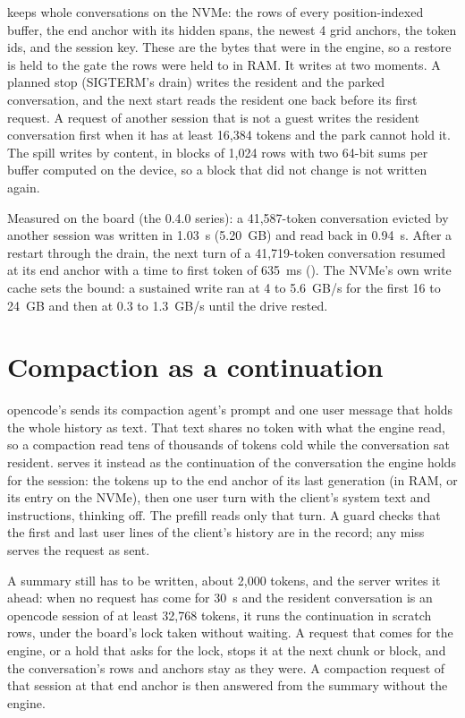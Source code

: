  keeps whole conversations on the NVMe: the rows of every position-indexed buffer, the end anchor with its hidden spans, the newest 4 grid anchors, the token ids,  and the session key. These are the bytes that were in the engine, so a restore is held to the gate the rows were held to in RAM. It writes at two moments. A planned stop (SIGTERM's drain) writes the resident and the parked conversation, and the next start reads the resident one back before its first request. A request of another session that is not a guest writes the resident conversation first when it has at least 16,384 tokens and the park cannot hold it. The spill writes by content, in blocks of 1,024 rows with two 64-bit sums per buffer computed on the device, so a block that did not change is not written again.

Measured on the board (the 0.4.0 series): a 41,587-token conversation evicted by another session was written in 1.03~s (5.20~GB) and read back in 0.94~s. After a restart through the drain, the next turn of a 41,719-token conversation resumed at its end anchor with a time to first token of 635~ms (\measured). The NVMe's own write cache sets the bound: a sustained write ran at 4 to 5.6~GB/s for the first 16 to 24~GB and then at 0.3 to 1.3~GB/s until the drive rested.

\section{Compaction as a continuation}\label{sec:compaction}

opencode's  sends its compaction agent's prompt and one user message that holds the whole history as text. That text shares no token with what the engine read, so a compaction read tens of thousands of tokens cold while the conversation sat resident.  serves it instead as the continuation of the conversation the engine holds for the session: the tokens up to the end anchor of its last generation (in RAM, or its entry on the NVMe), then one user turn with the client's system text and instructions, thinking off. The prefill reads only that turn. A guard checks that the first and last user lines of the client's history are in the record; any miss serves the request as sent.

A summary still has to be written, about 2,000 tokens, and the server writes it ahead: when no request has come for 30~s and the resident conversation is an opencode session of at least 32,768 tokens, it runs the continuation in scratch rows, under the board's lock taken without waiting. A request that comes for the engine, or a hold that asks for the lock, stops it at the next chunk or block, and the conversation's rows and anchors stay as they were. A compaction request of that session at that end anchor is then answered from the summary without the engine.

